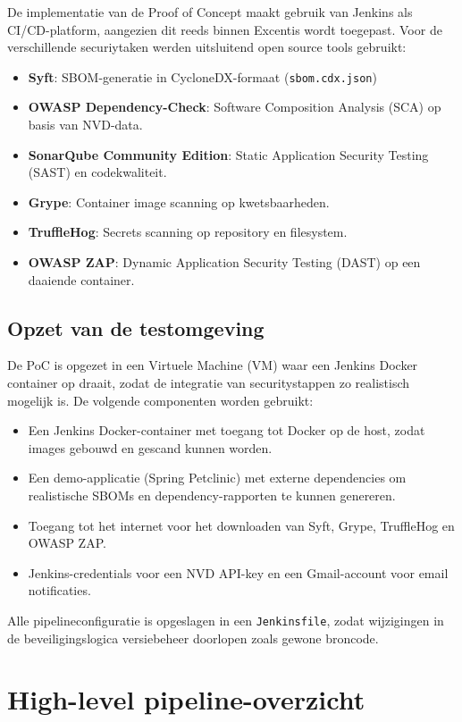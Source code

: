 De implementatie van de Proof of Concept maakt gebruik van Jenkins als CI/CD-platform, aangezien dit reeds binnen Excentis wordt toegepast. Voor de verschillende securiytaken werden uitsluitend open source tools gebruikt:
\begin{itemize}
    \item \textbf{Syft}: SBOM-generatie in CycloneDX-formaat (\texttt{sbom.cdx.json})
    \item \textbf{OWASP Dependency-Check}: Software Composition Analysis (SCA) op basis van NVD-data.
    \item \textbf{SonarQube Community Edition}: Static Application Security Testing (SAST) en codekwaliteit.
    \item \textbf{Grype}: Container image scanning op kwetsbaarheden.
    \item \textbf{TruffleHog}: Secrets scanning op repository en filesystem.
    \item \textbf{OWASP ZAP}: Dynamic Application Security Testing (DAST) op een daaiende container.
\end{itemize}

\subsection{Opzet van de testomgeving}

De PoC is opgezet in een Virtuele Machine (VM) waar een Jenkins Docker container op draait, zodat de integratie van securitystappen zo realistisch mogelijk is. De volgende componenten worden gebruikt:
\begin{itemize}
    \item Een Jenkins Docker-container met toegang tot Docker op de host, zodat images gebouwd en gescand kunnen worden.
    \item Een demo-applicatie (Spring Petclinic) met externe dependencies om realistische SBOMs en dependency-rapporten te kunnen genereren.
    \item Toegang tot het internet voor het downloaden van Syft, Grype, TruffleHog en OWASP ZAP. 
    \item Jenkins-credentials voor een NVD API-key en een Gmail-account voor email notificaties.
\end{itemize}

Alle pipelineconfiguratie is opgeslagen in een \texttt{Jenkinsfile}, zodat wijzigingen in de beveiligingslogica versiebeheer doorlopen zoals gewone broncode.


\section{High-level pipeline-overzicht}

